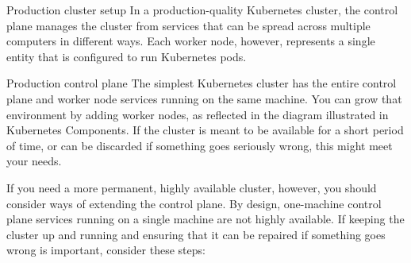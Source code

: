 Production cluster setup
In a production-quality Kubernetes cluster, the control plane manages the cluster from services that can be spread across multiple computers in different ways. Each worker node, however, represents a single entity that is configured to run Kubernetes pods.

Production control plane
The simplest Kubernetes cluster has the entire control plane and worker node services running on the same machine. You can grow that environment by adding worker nodes, as reflected in the diagram illustrated in Kubernetes Components. If the cluster is meant to be available for a short period of time, or can be discarded if something goes seriously wrong, this might meet your needs.

If you need a more permanent, highly available cluster, however, you should consider ways of extending the control plane. By design, one-machine control plane services running on a single machine are not highly available. If keeping the cluster up and running and ensuring that it can be repaired if something goes wrong is important, consider these steps:

